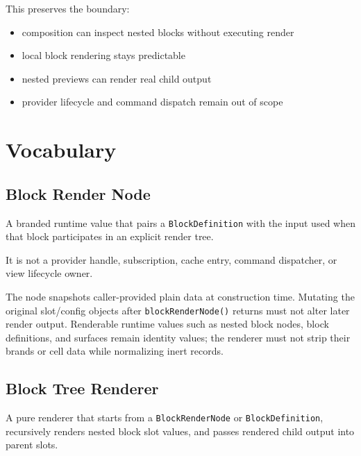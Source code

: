 This preserves the boundary:

\begin{itemize}
\tightlist
\item
  composition can inspect nested blocks without executing render
\item
  local block rendering stays predictable
\item
  nested previews can render real child output
\item
  provider lifecycle and command dispatch remain out of scope
\end{itemize}

\section{Vocabulary}\label{record-129-vocabulary}

\subsection{Block Render Node}\label{record-129-block-render-node}

A branded runtime value that pairs a \texttt{B\allowbreak{}l\allowbreak{}o\allowbreak{}c\allowbreak{}k\allowbreak{}D\allowbreak{}e\allowbreak{}f\allowbreak{}i\allowbreak{}n\allowbreak{}i\allowbreak{}t\allowbreak{}i\allowbreak{}o\allowbreak{}n} with the input used when that block participates in an explicit render tree.

It is not a provider handle, subscription, cache entry, command dispatcher, or view lifecycle owner.

The node snapshots caller-provided plain data at construction time. Mutating the original slot/config objects after \texttt{b\allowbreak{}l\allowbreak{}o\allowbreak{}c\allowbreak{}k\allowbreak{}R\allowbreak{}e\allowbreak{}n\allowbreak{}d\allowbreak{}e\allowbreak{}r\allowbreak{}N\allowbreak{}o\allowbreak{}d\allowbreak{}e\allowbreak{}(\allowbreak{})} returns must not alter later render output. Renderable runtime values such as nested block nodes, block definitions, and surfaces remain identity values; the renderer must not strip their brands or cell data while normalizing inert records.

\subsection{Block Tree Renderer}\label{record-129-block-tree-renderer}

A pure renderer that starts from a \texttt{B\allowbreak{}l\allowbreak{}o\allowbreak{}c\allowbreak{}k\allowbreak{}R\allowbreak{}e\allowbreak{}n\allowbreak{}d\allowbreak{}e\allowbreak{}r\allowbreak{}N\allowbreak{}o\allowbreak{}d\allowbreak{}e} or \texttt{B\allowbreak{}l\allowbreak{}o\allowbreak{}c\allowbreak{}k\allowbreak{}D\allowbreak{}e\allowbreak{}f\allowbreak{}i\allowbreak{}n\allowbreak{}i\allowbreak{}t\allowbreak{}i\allowbreak{}o\allowbreak{}n}, recursively renders nested block slot values, and passes rendered child output into parent slots.

